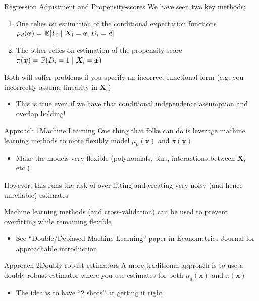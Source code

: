 \documentclass[aspectratio=169,t,11pt,table]{beamer}
\begin{document}
\begin{frame}{Regression Adjustment and Propensity-scores}
  We have seen two key methods:
  \begin{enumerate}
    \item One relies on estimation of the conditional expectation functions $\mu_d(\bm{x}) = \expec{Y_i}{\bm{X}_i = \bm{x}, D_i = d}$
    
    \item The other relies on estimation of the propensity score $\pi(\bm{x}) = \prob{D_i = 1}{\bm{X}_i = \bm{x}}$
  \end{enumerate}

  \bigskip
  Both will suffer problems if you specify an incorrect functional form (e.g. you incorrectly assume linearity in $\bm{X}_i$)
  \begin{itemize}
    \item This is true even if we have that conditional independence assumption and overlap holding! 
  \end{itemize}
\end{frame}

\begin{frame}{Approach 1}{Machine Learning}
  One thing that folks can do is leverage machine learning methods to more flexibly model $\mu_d(\bm{x})$ and $\pi(\bm{x})$
  \begin{itemize}
    \item Make the models very flexible (polynomials, bins, interactions between $\bm{X}$, etc.)
  \end{itemize}

  However, this runs the risk of over-fitting and creating very noisy (and hence unreliable) estimates

  \pause
  \bigskip
  Machine learning methods (and cross-validation) can be used to prevent overfitting while remaining flexible
  \begin{itemize}
    \item See ``Double/Debiased Machine Learning'' paper in Econometrics Journal for approachable introduction
  \end{itemize}
\end{frame}

\begin{frame}{Approach 2}{Doubly-robust estimators}
  A more traditional approach is to use a \alert{doubly-robust estimator} where you use estimates for both $\mu_d(\bm{x})$ and $\pi(\bm{x})$
  \begin{itemize}
    \item The idea is to have ``2 shots'' at getting it right
  \end{itemize}
\end{frame}
\end{document}
